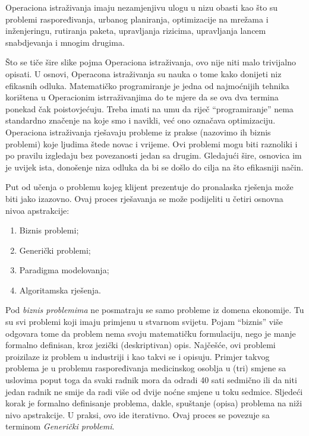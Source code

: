 \documentclass[a4paper, utf8, 11pt, colorlinks]{book}
\begin{document}
 Operaciona istraživanja imaju nezamjenjivu ulogu u nizu obasti kao što su problemi raspoređivanja, urbanog planiranja, optimizacije na mrežama i inženjeringu, rutiranja paketa, upravljanja rizicima, upravljanja lancem snabdjevanja i mnogim drugima. 

 Što se tiče   šire slike pojma Operaciona istraživanja, ovo nije niti malo trivijalno opisati. U osnovi, Operacona istraživanja su nauka o tome kako donijeti niz efikasnih odluka. Matematičko programiranje je jedna od najmoćnijih tehnika 
 korištena u Operacionim istrraživanjima do te mjere da  se   ova dva termina ponekad čak poistovjećuju. Treba imati na umu da riječ ``programiranje'' nema standardno značenje na koje smo i navikli, već ono označava optimizaciju. Operaciona istraživanja rješavaju probleme iz prakse (nazovimo ih biznis problemi) koje ljudima štede novac i vrijeme. Ovi problemi mogu biti raznoliki i po pravilu izgledaju bez povezanosti jedan sa drugim. Gledajući šire, osnovica im je uvijek ista, donošenje niza odluka da bi se došlo do cilja na što efikasniji način.  %

  Put od učenja o problemu kojeg klijent prezentuje do pronalaska rješenja može biti jako izazovno. Ovaj proces rješavanja se može podijeliti u četiri osnovna nivoa apstrakcije:
  \begin{enumerate}
      \item Biznis problemi;
      \item Generički problemi; 
      \item Paradigma modelovanja;
      \item Algoritamska rješenja. 
  \end{enumerate}
  
 Pod \emph{biznis problemima} ne posmatraju se  samo probleme iz domena ekonomije. Tu su svi problemi koji imaju primjenu u stvarnom svijetu. Pojam ``biznis'' više odgovara tome da problem nema svoju matematičku formulaciju, nego je manje formalno definisan, kroz jezički (deskriptivan) opis.  Najčešće, ovi problemi proizilaze iz problem u industriji i kao takvi se i opisuju. Primjer takvog problema je u problemu raspoređivanja medicinskog osoblja u (tri) smjene sa uslovima poput toga da svaki radnik mora da odradi 40 sati sedmično ili da niti jedan radnik ne smije da radi više od dvije noćne smjene u toku sedmice. Sljedeći korak 
 je formalno definisanje problema, dakle, spuštanje (opisa) problema na niži nivo apstrakcije. U praksi, ovo ide iterativno. Ovaj proces se povezuje sa terminom \emph{Generički problemi}. 
\end{document}
